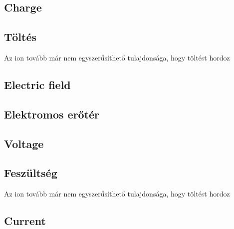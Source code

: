 \fi

\ifx\magyar\undefined
\subsection[Charge]{Charge\label{sec:Electricity-Charge}}

\else

\subsection[Töltés]{Töltés\label{sec:Electricity-Charge}}

Az ion tovább már nem egyszerűsíthető tulajdonsága, hogy
töltést hordoz
\fi


\ifx\magyar\undefined
\subsection[Field]{Electric field\label{sec:Electricity-Field}}

\else

\subsection[Erőtér]{Elektromos erőtér\label{sec:Electricity-Field}}

\fi


\ifx\magyar\undefined
\subsection[Voltage]{Voltage\label{sec:Electricity-Voltage}}

\else

\subsection[Feszültség]{Feszültség\label{sec:Electricity-Voltage}}

Az ion tovább már nem egyszerűsíthető tulajdonsága, hogy
töltést hordoz
\fi

\ifx\magyar\undefined
\subsection[Current]{Current\label{sec:Electricity-Current}}

